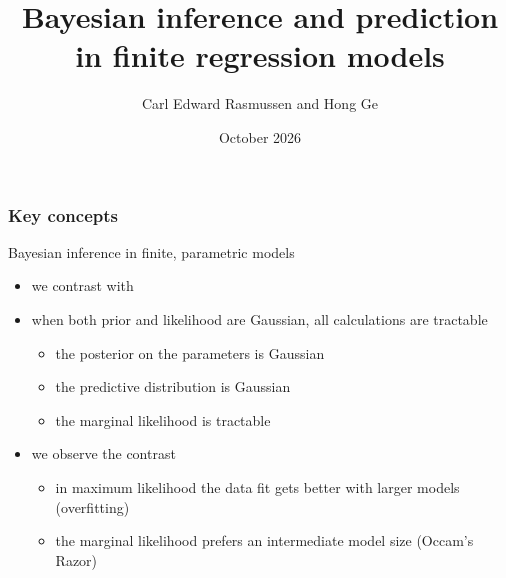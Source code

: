 

\title{Bayesian inference and prediction\\ in finite regression models}
\author{Carl Edward Rasmussen and Hong Ge}
\date{October 2026}



\begin{frame}
\titlepage
\end{frame}

\begin{frame}
\frametitle{Key concepts}

Bayesian inference in finite, parametric models
\begin{itemize}
\item we contrast  with 
\item when both prior and likelihood are Gaussian, all calculations
  are tractable
\begin{itemize}
\item the posterior on the parameters is Gaussian
\item the predictive distribution is Gaussian
\item the marginal likelihood is tractable
\end{itemize}
\item we observe the contrast
\begin{itemize}
\item in maximum likelihood the data fit gets better with larger
  models (overfitting)
\item the marginal likelihood prefers an intermediate model size
  (Occam's Razor)
\end{itemize}
\end{itemize}
\end{frame}


